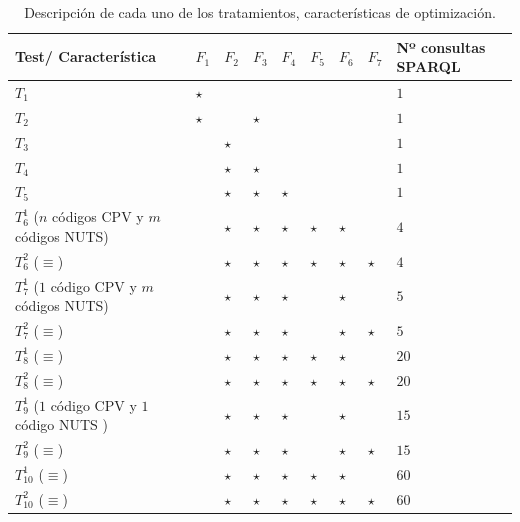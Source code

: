 \documentclass[a4paper,final,11pt,fleqn,twoside]{book}  %
\begin{document}
\begin{table}[!htb]
\renewcommand{\arraystretch}{1.3}
\begin{center}
\begin{tabular}{|p{3.5cm}|p{0.8cm}|p{0.8cm}|p{0.8cm}|p{0.8cm}|p{0.8cm}|p{0.8cm}|p{0.8cm}|p{2cm}|}
\hline
  \textbf{Test}/ \textbf{Característica}& \textbf{$F_1$} & \textbf{$F_2$} & \textbf{$F_3$} & \textbf{$F_4$} & \textbf{$F_5$} & \textbf{$F_6$} &  \textbf{$F_7$} & \textbf{Nº consultas SPARQL} \\ \hline
   $T_1$ & $\star$ & & & & & & &$1$\\ \hline 
   $T_2$ & $\star$ & & $\star$ & & & & &$1$\\ \hline 
   $T_3$ &  & $\star$ &  & & & & &$1$\\ \hline 
   $T_4$ &  & $\star$ & $\star$ & & & & &$1$\\ \hline 
   $T_5$ &  & $\star$ & $\star$ & $\star$ & & & &$1$\\ \hline 
   $T^{1}_6$ ($n$ códigos CPV y $m$ códigos NUTS)&  & $\star$ & $\star$ & $\star$ & $\star$ & $\star$ & &$4$\\ \hline 
   $T^{2}_6$ ($\equiv$)&  & $\star$ & $\star$ & $\star$ & $\star$ & $\star$ & $\star$ &$4$\\ \hline 
   $T^{1}_7$ ($1$ código CPV y $m$ códigos NUTS) &  & $\star$ & $\star$ & $\star$ &  & $\star$ &  &$5$ \\ \hline 
   $T^{2}_7$ ($\equiv$) & & $\star$ & $\star$ & $\star$ &  & $\star$ & $\star$ &$5$\\ \hline 
   $T^{1}_8$ ($\equiv$)& & $\star$ & $\star$ & $\star$ & $\star$ & $\star$ &  &$20$\\ \hline 
   $T^{2}_8$ ($\equiv$) & & $\star$ & $\star$ & $\star$ & $\star$ & $\star$ &  $\star$ &$20$\\ \hline 
   $T^{1}_9$ ($1$ código CPV y $1$ código NUTS ) & & $\star$ & $\star$ & $\star$ &  & $\star$ & &$15$  \\ \hline 
   $T^{2}_9$ ($\equiv$)& & $\star$ & $\star$ & $\star$ & & $\star$ &  $\star$ &$15$\\ \hline 
   $T^{1}_{10}$ ($\equiv$) & & $\star$ & $\star$ & $\star$ & $\star$ & $\star$ & &$60$  \\ \hline 
   $T^{2}_{10}$ ($\equiv$) & & $\star$ & $\star$ & $\star$ & $\star$ & $\star$ & $\star$ &$60$ \\ \hline 
  \hline
  \end{tabular}
  \caption{Descripción de cada uno de los tratamientos, características de optimización.}
  \label{tabla:tests}
  \end{center}
\end{table} 
\end{document}
